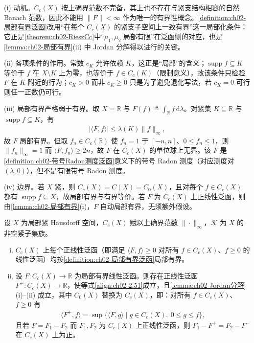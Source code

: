 \documentclass[../../main.tex]{subfiles}%
\begin{document}
\begin{remark}\label{remark:ch02-局部有界动机}
(i) 动机。$C_c(X)$ 按上确界范数不完备，其上也不存在与紧支结构相容的自然 Banach 范数，因此不能用 $\|F\|<\infty$ 作为唯一的有界性概念。\cref{definition:ch02-局部有界泛函}改用“在每个 $C_c(X)$ 的紧支子空间上一致有界”这一局部化条件：它正是\cref{theorem:ch02-RieszCc}中“$\mu_1,\mu_2$ 局部有限”在泛函侧的对应，也是\cref{lemma:ch02-局部有界}(ii) 中 Jordan 分解得以进行的关键。

(ii) 各项条件的作用。常数 $c_K$ 允许依赖 $K$，这正是“局部”的含义；$\operatorname{supp}f\subseteq K$ 等价于 $f$ 在 $X\setminus K$ 上为零，也等价于 $f\in C_c(K)$（限制意义），故该条件只检验 $F$ 在 $K$ 附近的行为；$c_K>0$ 而非 $c_K\geqslant0$ 只是为了避免退化写法，若 $c_K=0$ 可行则任一正数仍可行。

(iii) 局部有界严格弱于有界。取 $X=\mathbb R$ 与 $F(f)\triangleq\int_{\mathbb R}f\,\mathrm{d}\lambda$。对紧集 $K\subseteq\mathbb R$ 与 $\operatorname{supp}f\subseteq K$，有
\begin{align*}
|\langle F,f\rangle|\leqslant\lambda(K)\|f\|_\infty,
\end{align*}
故 $F$ 局部有界。但取 $f_n\in C_c(\mathbb R)$ 使 $f_n=1$ 于 $[-n,n]$、$0\leqslant f_n\leqslant1$，则 $\|f_n\|_\infty=1$ 而 $\langle F,f_n\rangle\geqslant2n$，故 $F$ 在 $C_c(X)$ 的单位球上无界。该 $F$ 是\cref{definition:ch02-带号Radon测度泛函}意义下的带号 Radon 测度（对应测度对 $(\lambda,0)$），但不是有限带号 Radon 测度。

(iv) 边界。若 $X$ 紧，则 $C_c(X)=C(X)=C_0(X)$，且对每个 $f\in C_c(X)$ 都有 $\operatorname{supp}f\subseteq X$，故局部有界与有界等价。若 $F$ 为 $C_c(X)$ 上正线性泛函，则由\cref{lemma:ch02-局部有界}(i)，$F$ 自动局部有界，无须额外假设。
\end{remark}

\begin{lemma}\label{lemma:ch02-局部有界}
设 $X$ 为局部紧 Hausdorff 空间，$C_c(X)$ 赋以上确界范数 $\|\cdot\|_\infty$，$\mathscr K$ 为 $X$ 的非空紧子集族。
\begin{enumerate}[(i)]
\item $C_c(X)$ 上每个正线性泛函（即满足 $\langle F,f\rangle\geqslant0$ 对所有 $f\in C_c(X)$、$f\geqslant0$ 的线性泛函）均按\cref{definition:ch02-局部有界泛函}局部有界。
\item 设 $F:C_c(X)\to\mathbb R$ 为局部有界线性泛函。则存在正线性泛函 $F^\pm:C_c(X)\to\mathbb R$，使等式\eqref{align:ch02-2.51}成立，且\cref{lemma:ch02-Jordan分解}(i)--(ii) 成立，其中 $C_0(X)$ 替换为 $C_c(X)$，即：对所有 $f\in C_c(X)$、$f\geqslant0$ 有
\begin{align*}
\langle F^+,f\rangle=\sup\{\langle F,g\rangle\mid g\in C_c(X),\ 0\leqslant g\leqslant f\},
\end{align*}
且若 $F=F_1-F_2$ 而 $F_1,F_2$ 为 $C_c(X)$ 上正线性泛函，则 $F_1-F^+=F_2-F^-$ 在 $C_c(X)$ 上为正。
\end{enumerate}
\end{lemma}
\end{document}
